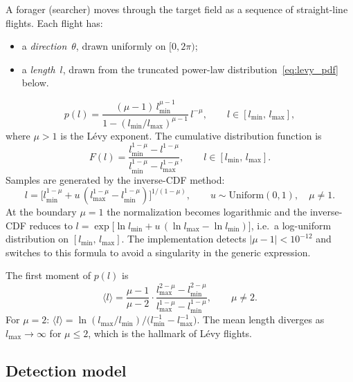 A forager (searcher) moves through the target field as a
sequence of straight-line flights.  Each flight has:
\begin{itemize}
  \item a \emph{direction}~$\theta$, drawn uniformly on
        $[0,2\pi)$;
  \item a \emph{length}~$l$, drawn from the truncated power-law
        distribution~\eqref{eq:levy_pdf} below.
\end{itemize}
\begin{equation}
  p(l) = \frac{(\mu-1)\,l_{\min}^{\mu-1}}{1 - (l_{\min}/l_{\max})^{\mu-1}}\,
         l^{-\mu}, \qquad l \in [l_{\min},\,l_{\max}],
  \label{eq:levy_pdf}
\end{equation}
where $\mu > 1$ is the L\'evy exponent.  The cumulative
distribution function is
\begin{equation}
  F(l) = \frac{l_{\min}^{1-\mu} - l^{1-\mu}}
              {l_{\min}^{1-\mu} - l_{\max}^{1-\mu}},
  \qquad l \in [l_{\min},\,l_{\max}].
\end{equation}
Samples are generated by the inverse-CDF method:
\begin{equation}
  l = \bigl[l_{\min}^{1-\mu}
      + u\,(l_{\max}^{1-\mu} - l_{\min}^{1-\mu})\bigr]^{1/(1-\mu)},
  \qquad u \sim \mathrm{Uniform}(0,1),\quad \mu \neq 1.
  \label{eq:inverse_cdf}
\end{equation}
At the boundary $\mu = 1$ the normalization becomes
logarithmic and the inverse-CDF reduces to
$l = \exp\!\bigl[\ln l_{\min} + u\,(\ln l_{\max} - \ln l_{\min})\bigr]$,
i.e.\ a log-uniform distribution on $[l_{\min},\,l_{\max}]$.
The implementation detects $|\mu - 1| < 10^{-12}$ and switches
to this formula to avoid a singularity in the generic expression.

The first moment of $p(l)$ is
\begin{equation}
  \langle l \rangle = \frac{\mu-1}{\mu-2}\cdot
     \frac{l_{\max}^{2-\mu} - l_{\min}^{2-\mu}}
          {l_{\max}^{1-\mu} - l_{\min}^{1-\mu}},
  \qquad \mu \neq 2.
  \label{eq:mean_l}
\end{equation}
For $\mu = 2$: $\langle l \rangle = \ln(l_{\max}/l_{\min})
\big/ \bigl(l_{\min}^{-1} - l_{\max}^{-1}\bigr)$.
The mean length diverges as $l_{\max}\to\infty$ for $\mu \leq 2$,
which is the hallmark of L\'evy flights.

\subsection{Detection model}

